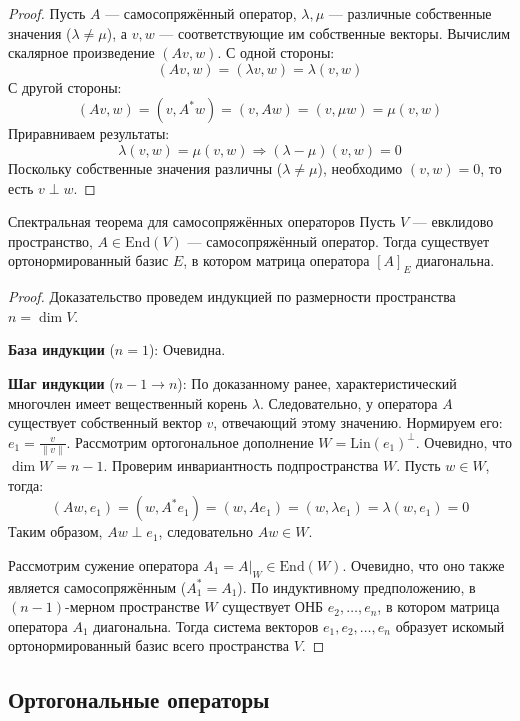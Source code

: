 \begin{proof}
	Пусть $A$ — самосопряжённый оператор, $\lambda, \mu$ — различные собственные значения ($\lambda \neq \mu$), а $v, w$ — соответствующие им собственные векторы.
	Вычислим скалярное произведение $(Av, w)$.
	С одной стороны:
	\[
	(Av, w) = (\lambda v, w) = \lambda (v, w)
	\]
	С другой стороны:
	\[
	(Av, w) = (v, A^* w) = (v, Aw) = (v, \mu w) = \mu (v, w)
	\]
	Приравниваем результаты:
	\[
	\lambda (v, w) = \mu (v, w) \Rightarrow (\lambda - \mu)(v, w) = 0
	\]
	Поскольку собственные значения различны ($\lambda \neq \mu$), необходимо $(v, w) = 0$, то есть $v \perp w$.
\end{proof}

\begin{Theorem}{Спектральная теорема для самосопряжённых операторов}{}
	Пусть $V$ — евклидово пространство, $A \in \mathrm{End}(V)$ — самосопряжённый оператор. Тогда существует ортонормированный базис $E$, в котором матрица оператора $[A]_E$ диагональна.
\end{Theorem}

\begin{proof}
	Доказательство проведем индукцией по размерности пространства $n = \dim V$.
	
	\textbf{База индукции} ($n = 1$): Очевидна.
	
	\textbf{Шаг индукции} ($n - 1 \to n$):
	По доказанному ранее, характеристический многочлен имеет вещественный корень $\lambda$. Следовательно, у оператора $A$ существует собственный вектор $v$, отвечающий этому значению. Нормируем его: $e_1 = \frac{v}{\|v\|}$.
	Рассмотрим ортогональное дополнение $W = \mathrm{Lin}(e_1)^\perp$. Очевидно, что $\dim W = n - 1$.
	Проверим инвариантность подпространства $W$. Пусть $w \in W$, тогда:
	\[
	(Aw, e_1) = (w, A^* e_1) = (w, A e_1) = (w, \lambda e_1) = \lambda (w, e_1) = 0
	\]
	Таким образом, $Aw \perp e_1$, следовательно $Aw \in W$.
	
	Рассмотрим сужение оператора $A_1 = A|_W \in \mathrm{End}(W)$. Очевидно, что оно также является самосопряжённым ($A_1^* = A_1$).
	По индуктивному предположению, в $(n-1)$-мерном пространстве $W$ существует ОНБ $e_2, \dots, e_n$, в котором матрица оператора $A_1$ диагональна.
	Тогда система векторов $e_1, e_2, \dots, e_n$ образует искомый ортонормированный базис всего пространства $V$.
\end{proof}

\subsection{Ортогональные операторы}

